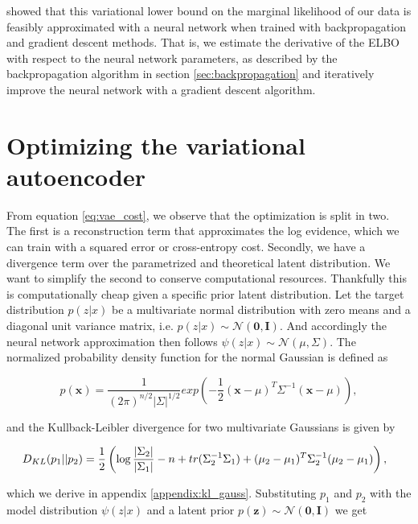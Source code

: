 \citet{Kingma2013} showed that this variational lower bound on the marginal likelihood of our data is feasibly approximated with a neural network when trained with backpropagation and gradient descent methods. That is, we estimate the derivative of the ELBO with respect to the neural network parameters, as described by the backpropagation algorithm in section \ref{sec:backpropagation} and iteratively improve the neural network with a gradient descent algorithm.

\section{Optimizing the variational autoencoder}

From equation \ref{eq:vae_cost}, we observe that the optimization is split in two. The first is a reconstruction term that approximates the log evidence, which we can train with a squared error or cross-entropy cost. Secondly, we have a divergence term over the parametrized and theoretical latent distribution. We want to simplify the second to conserve computational resources. Thankfully this is computationally cheap given a specific prior latent distribution. Let the target distribution $p(z | x) $ be a multivariate normal distribution with zero means and a diagonal unit variance matrix, i.e. $p(z | x) \sim  \mathcal{N}(\boldsymbol{0}, \boldsymbol{I})$. And accordingly the neural network approximation then follows $\psi(z | x) \sim \mathcal{N}(\mu, \Sigma)$. The normalized probability density function for the normal Gaussian is defined as 

\begin{equation}
p(\boldsymbol{x}) = \frac{1}{(2\pi)^{n/2}|\Sigma|^{1/2}}exp(-\frac{1}{2}(\boldsymbol{x} - \mathbb{\mu})^T\Sigma^{-1}(\boldsymbol{x}-\mu)),
\end{equation}

\noindent and the Kullback-Leibler divergence for two multivariate Gaussians is given by 


\begin{equation}
\hspace*{-0.1in}
D_{KL}(p_1|| p_2 ) = \frac{1}{2} \left( \log \frac{|\Sigma_2|}{|\Sigma_1|} -n + tr(\Sigma^{-1}_2 \Sigma_1) + (\mu_2 - \mu_1)^T\Sigma_2^{-1}(\mu_2 - \mu_1) \right),
\end{equation}

\noindent which we derive in appendix \ref{appendix:kl_gauss}. Substituting $p_1$ and $p_2$ with the model distribution $\psi(z|x)$ and a latent prior $p(\boldsymbol{z}) \sim \mathcal{N}(\boldsymbol{0}, \boldsymbol{I})$ we get 

